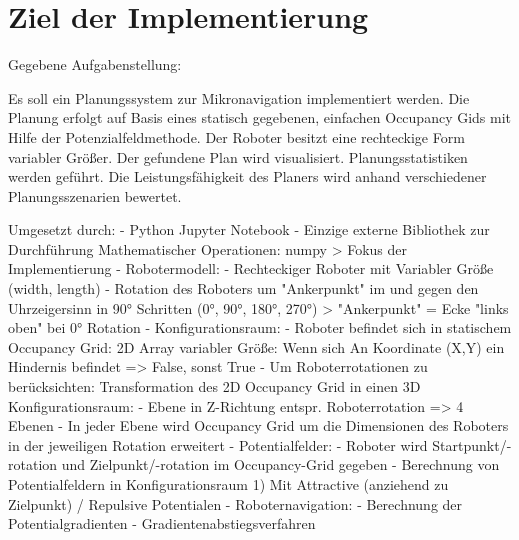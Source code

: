 \chapter{Ziel der Implementierung}

Gegebene Aufgabenstellung:

Es soll ein Planungssystem zur Mikronavigation implementiert werden. Die
Planung erfolgt auf Basis eines statisch gegebenen, einfachen Occupancy Gids
mit Hilfe der Potenzialfeldmethode. Der Roboter besitzt eine rechteckige Form
variabler Größer. Der gefundene Plan wird visualisiert. Planungsstatistiken
werden geführt. Die Leistungsfähigkeit des Planers wird anhand verschiedener
Planungsszenarien bewertet.

Umgesetzt durch:
- Python Jupyter Notebook
- Einzige externe Bibliothek zur Durchführung Mathematischer Operationen: numpy
> Fokus der Implementierung
	- Robotermodell: 
		- Rechteckiger Roboter mit Variabler Größe (width, length)
		- Rotation des Roboters um "Ankerpunkt" im und gegen den Uhrzeigersinn in 90° Schritten (0°, 90°, 180°, 270°) 
			> "Ankerpunkt" = Ecke "links oben" bei 0° Rotation
	- Konfigurationsraum:
		- Roboter befindet sich in statischem Occupancy Grid: 2D Array variabler Größe: Wenn sich An Koordinate (X,Y) ein Hindernis befindet => False, sonst True
		- Um Roboterrotationen zu berücksichten: Transformation des 2D Occupancy Grid in einen 3D Konfigurationsraum:
		- Ebene in Z-Richtung entspr. Roboterrotation => 4 Ebenen
		- In jeder Ebene wird Occupancy Grid um die Dimensionen des Roboters in der jeweiligen Rotation erweitert
	- Potentialfelder:
		- Roboter wird Startpunkt/-rotation und Zielpunkt/-rotation im Occupancy-Grid gegeben
		- Berechnung von Potentialfeldern in Konfigurationsraum 1) Mit Attractive (anziehend zu Zielpunkt) / Repulsive Potentialen
	- Roboternavigation:
		- Berechnung der Potentialgradienten
		- Gradientenabstiegsverfahren
